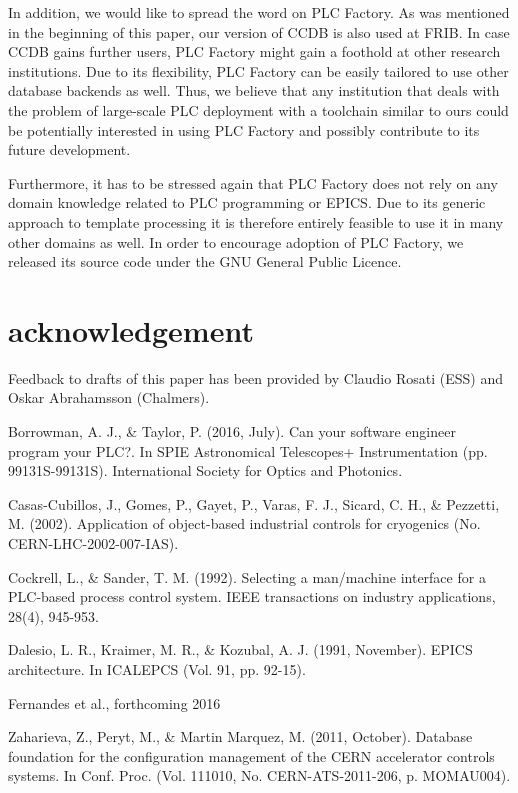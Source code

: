 \documentclass[a4paper,
              ]{jacow}
\begin{document}
In addition, we would like to spread the word on PLC Factory. As was mentioned in the beginning of this paper, our version of CCDB is also used at FRIB. In case CCDB gains further users, PLC Factory might gain a foothold at other research institutions. Due to its flexibility, PLC Factory can be easily tailored to use other database backends as well. Thus, we believe that any institution that deals with the problem of large-scale PLC deployment with a toolchain similar to ours could be potentially interested in using PLC Factory and possibly contribute to its future development.

Furthermore, it has to be stressed again that PLC Factory does not rely on any domain knowledge related to PLC programming or EPICS. Due to its generic approach to template processing it is therefore entirely feasible to use it in many other domains as well. In order to encourage adoption of PLC Factory, we released its source code under the GNU General Public Licence.

\section{acknowledgement}
Feedback to drafts of this paper has been provided by Claudio Rosati (ESS) and Oskar Abrahamsson (Chalmers).


\begin{thebibliography}{9} %

 Borrowman, A. J., \& Taylor, P. (2016, July). Can your software engineer program your PLC?. In SPIE Astronomical Telescopes+ Instrumentation (pp. 99131S-99131S). International Society for Optics and Photonics.

 Casas-Cubillos, J., Gomes, P., Gayet, P., Varas, F. J., Sicard, C. H., \& Pezzetti, M. (2002). Application of object-based industrial controls for cryogenics (No. CERN-LHC-2002-007-IAS).

 Cockrell, L., \& Sander, T. M. (1992). Selecting a man/machine interface for a PLC-based process control system. IEEE transactions on industry applications, 28(4), 945-953.

 Dalesio, L. R., Kraimer, M. R., \& Kozubal, A. J. (1991, November). EPICS architecture. In ICALEPCS (Vol. 91, pp. 92-15).

 Fernandes et al., forthcoming 2016

 Zaharieva, Z., Peryt, M., \& Martin Marquez, M. (2011, October). Database foundation for the configuration management of the CERN accelerator controls systems. In Conf. Proc. (Vol. 111010,  No. CERN-ATS-2011-206, p. MOMAU004).

\end{thebibliography}
\null  %
\end{document}
